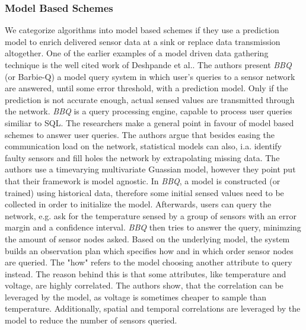 \subsubsection{Model Based Schemes}
\label{sec:Model Based Schemes}

We categorize algorithms into model based schemes if they use a prediction
model to enrich delivered sensor data at a sink or replace data transmission
altogether. One of the earlier examples of a model driven data gathering
technique is the well cited work of Deshpande et al.\cite{deshpande2004model}.
The authors present \textit{BBQ} (or Barbie-Q) a model query system in which
user's queries to a sensor network are answered, until some error threshold,
with a prediction model. Only if the prediction is not accurate enough, actual
sensed values are transmitted through the network. \textit{BBQ} is a query
processing engine, capable to process user queries similiar to \ac{SQL}. The
researchers make a general point in favour of model based schemes to answer
user queries. The authors argue that besides easing the communication load on
the network, statistical models can also, i.a. identify faulty sensors and fill
holes the network by extrapolating missing data. The authors use a timevarying
multivariate Guassian model, however they point put that their framework is
model agnostic. In \textit{BBQ}, a model is constructed (or trained) using
historical data, therefore some initial sensed values need to be collected in
order to initialize the model. Afterwards, users can query the network, e.g.
ask for the temperature sensed by a group of sensors with an error margin and a
confidence interval. \textit{BBQ} then tries to answer the query, minimzing the
amount of sensor nodes asked. Based on the underlying model, the system builds
an observation plan which specifies how and in which order sensor nodes are
queried. The "how" refers to the model choosing another attribute to query
instead. The reason behind this is that some attributes, like temperature and
voltage, are highly correlated. The authors show, that the correlation can be
leveraged by the model, as voltage is sometimes cheaper to sample than
temperature. Additionally, spatial and temporal correlations are leveraged by
the model to reduce the number of sensors queried.

